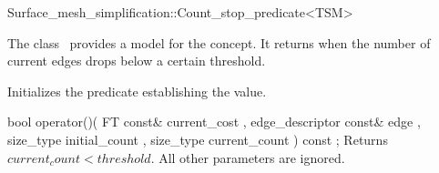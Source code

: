 

\begin{ccRefClass}{Surface_mesh_simplification::Count_stop_predicate<TSM>}


\ccDefinition

The class \ccRefName\ provides a model for the  concept.
It returns  when the number of current edges drops below a certain threshold.


\ccIsModel
{}

\ccCreation
{}  %

{Initializes the predicate establishing the  value.} 

\ccOperations

  \ccMethod
    {bool operator()( FT const&              current_cost
                    , edge_descriptor const& edge
                    , size_type              initial_count
                    , size_type              current_count
                    ) const ;
           }
  {Returns $current_count<threshold$. All other parameters are ignored.}

\ccSeeAlso
{}

\end{ccRefClass}



